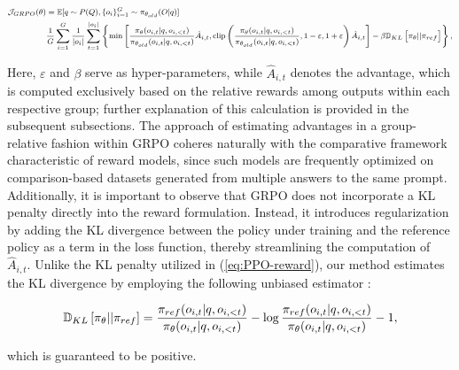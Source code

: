 \begin{itemize}[topsep=0pt]
\begin{itemize}[topsep=0pt]
\begin{equation}
\footnotesize
\begin{split}
    \mathcal{J}_{GRPO}(\theta) &= \mathbb{E}{[q \sim P(Q), \{o_i\}_{i=1}^G \sim \pi_{\theta_{old}}(O|q)]}  \\
    & \frac{1}{G}\sum_{i=1}^G\frac{1}{|o_i|} \sum_{t=1}^{|o_i|} \left\{ \min \left[ \frac{\pi_\theta(o_{i,t} | q, o_{i,<t})}{\pi_{\theta_{old}}(o_{i,t} | q, o_{i,<t})} \hat{A}_{i,t}, \text{clip} \left( \frac{\pi_\theta(o_{i,t} | q, o_{i,<t})}{\pi_{\theta_{old}}(o_{i,t} | q, o_{i,<t})}, 1 - \varepsilon, 1 + \varepsilon \right)  \hat{A}_{i,t} \right] - \beta \mathbb{D}_{KL}\left[\pi_{\theta} || \pi_{ref}\right]\right\} ,
\end{split}
\label{eq:GRPO-obj}
\end{equation}

Here, $\varepsilon$ and $\beta$ serve as hyper-parameters, while $\hat{A}_{i,t}$ denotes the advantage, which is computed exclusively based on the relative rewards among outputs within each respective group; further explanation of this calculation is provided in the subsequent subsections. The approach of estimating advantages in a group-relative fashion within GRPO coheres naturally with the comparative framework characteristic of reward models, since such models are frequently optimized on comparison-based datasets generated from multiple answers to the same prompt. Additionally, it is important to observe that GRPO does not incorporate a KL penalty directly into the reward formulation. Instead, it introduces regularization by adding the KL divergence between the policy under training and the reference policy as a term in the loss function, thereby streamlining the computation of $\hat{A}_{i,t}$. Unlike the KL penalty utilized in (\ref{eq:PPO-reward}), our method estimates the KL divergence by employing the following unbiased estimator \citep{kl_approx}:

\begin{equation}
\small
    \mathbb{D}_{KL}\left[\pi_{\theta} || \pi_{ref}\right] = \frac{\pi_{ref}(o_{i,t}|q,o_{i,<t})}{\pi_{\theta}(o_{i,t}|q,o_{i,<t})}- \log\frac{\pi_{ref}(o_{i,t}|q,o_{i,<t})}{\pi_{\theta}(o_{i,t}|q,o_{i,<t})} - 1,
\end{equation}

which is guaranteed to be positive.


\end{itemize}
\end{itemize}
